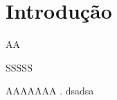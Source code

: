 \chapter{Introdução}\label{cp1}



AA
\begin{sloppypar}
SSSSS
\end{sloppypar}


AAAAAAA \cite{jawbone}.
dsadsa
